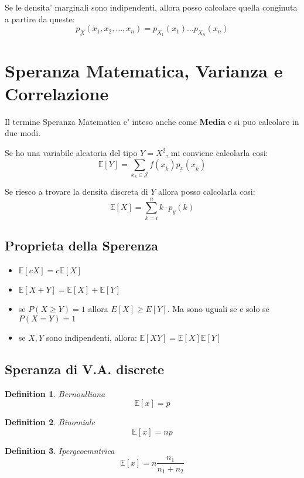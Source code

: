 \documentclass{article}
\newtheorem{definition}{Definition}[section]
\begin{document}
    Se le densita' marginali sono indipendenti, allora posso calcolare quella conginuta a partire da queste:
    $$
    p_{\underbar X}(x_1, x_2, \dots, x_n) = p_{X_1}(x_1) \dots p_{X_n}({x_n})
    $$

    \newpage
    \section { Speranza Matematica, Varianza e Correlazione }
    Il termine Speranza Matematica e' inteso anche come \textbf{Media} e si puo calcolare in due modi.
    
    Se ho una variabile aleatoria del tipo $Y=X^2$, mi conviene calcolarla cosi:
    $$
    \mathbb E[Y] = \sum_{x_k \in \mathcal J} f(\underbar{x}_k) p_{\underbar{x}}(\underbar{x}_k)
    $$

    Se riesco a trovare la densita discreta di $Y$ allora posso calcolarla cosi:
    $$
    \mathbb E[X] = \sum_{k=i}^n k \cdot p_y (k)
    $$

    \subsection{Proprieta della Sperenza}
    \begin{itemize}
        \item $\mathbb E[cX] = c \mathbb E[X]$
        \item $\mathbb E[X+Y] = \mathbb E[X] + \mathbb E[Y]$
        \item se $P(X \geq Y) = 1$ allora $E[X] \geq E[Y]$. Ma sono uguali se e solo se $P(X=Y)=1$
        \item se $X, Y$ sono indipendenti, allora: $\mathbb E[X Y] = \mathbb E[X] \mathbb E[Y]$
    \end{itemize}

    \subsection{Speranza di V.A. discrete}
    \begin{definition} Bernoulliana
        $$
        \mathbb E[x] = p
        $$
    \end{definition}

    \begin{definition} Binomiale
        $$
        \mathbb E[x] = np
        $$
    \end{definition}

    \begin{definition} Ipergeoemntrica
        $$
        \mathbb E[x] = n \frac{n_1}{n_1 + n_2}
        $$
    \end{definition}
\end{document}
